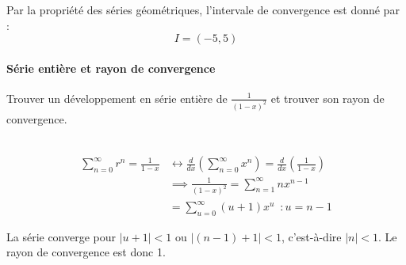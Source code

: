 \documentclass{report}
\begin{document}
\begin{multicols*}{2}
      Par la propriété des séries géométriques, 
      l'intervale de convergence 
      est donné par  :
      \[ I = (-5, 5) \]


      \paragraph{Série entière et rayon de convergence}
      Trouver un développement en série entière de  
      $\frac{1}{(1-x)^2}$ et  trouver son rayon de convergence.

      \mbox{}\\
      \begin{align*}
        \sum_{n=0}^{\infty }r^n =  \frac{1}{1 - x}  
          &\leftrightarrow 
              \frac{d}{dx}\left( \sum_{n=0}^{\infty }x^n\right) 
              = 
              \frac{d}{dx}\left( \frac{1}{1 - x}\right) \\
          &\implies
          \frac{1}{(1 - x)^2} = \sum_{n=1}^{\infty }nx^{n-1} \\ 
          &= 
          \sum_{u=0}^{\infty }(u+1)x^{u}
              \;\ : u = n - 1
      \end{align*}    

      La série converge pour $|u + 1| < 1$ ou $|(n -1) + 1| < 1$, 
      c'est-à-dire $|n| < 1$. Le rayon de convergence est donc 
      1. 








  








 









\end{multicols*}
\end{document}

